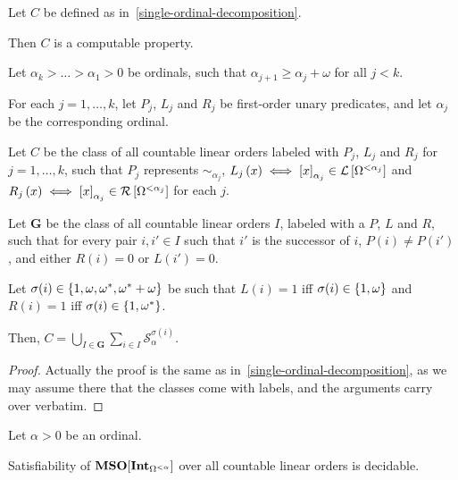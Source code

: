\begin{corollary}\label{countables-computable}
  Let $C$ be defined as in~\cref{single-ordinal-decomposition}.

  Then $C$ is a computable property.
\end{corollary}

\begin{lemma}{\label{many-ordinals-decomposition}}
  Let $\alpha_k > \ldots > \alpha_1 > 0$ be ordinals, such that
  $\alpha_{j+1} \ge \alpha_j + \omega$ for all $j < k$.

  For each $j = 1, \ldots, k$, let $P_j$, $L_j$ and $R_j$ be
  first-order unary predicates, and let $\alpha_j$ be the corresponding ordinal.

  Let $C$ be the class of
  all countable linear orders labeled with $P_j$, $L_j$ and $R_j$ for $j = 1, \ldots, k$,
  such that $P_j$ represents $\sim_{\alpha_j}$,
  $L_j \left( {x} \right) \iff \left[ {x} \right]_{\alpha_j} \in \mathcal{L} \left[ {{\Omega^{< \alpha_j}}} \right]$ and
  $R_j \left( {x} \right) \iff \left[ {x} \right]_{\alpha_j} \in \mathcal{R} \left[ {{\Omega^{< \alpha_j}}} \right]$ for each $j$.

  Let $\mathbf{G}$ be the class of all countable linear orders $I$,
  labeled with a $P$, $L$ and $R$,
  such that for every pair $i, i' \in I$ such that $i'$ is the successor of $i$,
  $P(i) \ne P(i')$,
  and either $R(i) = 0$ or $L(i') = 0$.

  Let $\sigma(i) \in \left\{ {1, \omega, \omega^\ast, \omega^\ast + \omega} \right\}$ be such that
  $L(i) = 1$ iff $\sigma(i) \in \left\{ {1, \omega} \right\}$ and
  $R(i) = 1$ iff $\sigma(i) \in \left\{ {1, \omega^\ast} \right\}$.

  Then, $C = \bigcup_{I \in \mathbf{G}} \sum_{i \in I} \mathcal{S}^{\sigma(i)}_{\alpha}$.
\end{lemma}

\begin{proof}
  Actually the proof is the same as in~\cref{single-ordinal-decomposition},
  as we may assume there that the classes come with labels,
  and the arguments carry over verbatim.
\end{proof}

\begin{theorem}\label{single-ordinal-satisfiability}
  Let $\alpha > 0$ be an ordinal.

  Satisfiability of $\mathbf{MSO}[\mathbf{Int}_{\Omega^{< \alpha}}]$ 
  over all countable linear orders is decidable.
\end{theorem}

